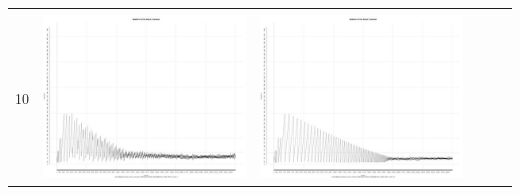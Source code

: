 \begin{table}[htbp]
{\begin{tabular}{l | ccccc}
\begin{minipage}{.15\textwidth}
    				 \end{minipage}\\			
		10	   & \begin{minipage}{.15\textwidth}\vspace{2pt}     							
     			 	\includegraphics[width=\linewidth]{images/mema-triple/I2}
    				\end{minipage}
    			   & \begin{minipage}{.15\textwidth}\vspace{2pt}     							
     			 	\includegraphics[width=\linewidth]{images/mema-triple/I6}
    				 \end{minipage}\\		

\end{tabular}}
\end{table}
